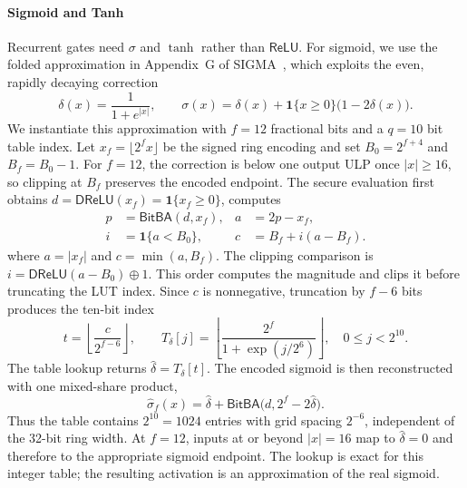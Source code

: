 \documentclass[journal]{IEEEtran}
\theoremstyle{definition}
\theoremstyle{plain}
\newcommand{\DReLU}{\mathsf{DReLU}}
\newcommand{\ReLU}{\mathsf{ReLU}}
\newcommand{\BitBA}{\mathsf{BitBA}}
\newcommand{\ind}[1]{\mathbf{1}\{#1\}}
\begin{document}
\paragraph*{Sigmoid and Tanh}
Recurrent gates need $\sigma$ and $\tanh$ rather than $\ReLU$. For sigmoid,
we use the folded approximation in Appendix~G of SIGMA~\cite{sigma}, which
exploits the even, rapidly decaying correction
\begin{equation}
  \delta(x)=\frac{1}{1+e^{|x|}}, \qquad
  \sigma(x)=\delta(x)+\ind{x\geq 0}\bigl(1-2\delta(x)\bigr).
  \label{eq:sigmoid-decomp}
\end{equation}
We instantiate this approximation with $f=12$ fractional bits and a $q=10$
bit table index. Let $x_f=\lfloor 2^f x\rfloor$ be the signed ring encoding
and set $B_0=2^{f+4}$ and $B_f=B_0-1$. For $f=12$, the correction is
below one output ULP once $|x|\geq 16$, so clipping at $B_f$ preserves the
encoded endpoint. The secure evaluation first obtains
$d=\DReLU(x_f)=\ind{x_f\geq 0}$, computes
\begin{equation}
\begin{aligned}
  p&=\BitBA(d,x_f), & a&=2p-x_f,\\
  i&=\ind{a<B_0}, & c&=B_f+i(a-B_f).
\end{aligned}
\label{eq:sigmoid-fold}
\end{equation}
where $a=|x_f|$ and $c=\min(a,B_f)$. The clipping comparison is
$i=\DReLU(a-B_0)\oplus 1$. This order computes the magnitude and clips it
before truncating the LUT index. Since $c$ is
nonnegative, truncation by $f-6$ bits produces the ten-bit index
\begin{equation}
  t=\left\lfloor\frac{c}{2^{f-6}}\right\rfloor, \qquad
  T_\delta[j]=\left\lfloor
    \frac{2^f}{1+\exp(j/2^6)}\right\rfloor,
  \quad 0\leq j<2^{10}.
  \label{eq:sigmoid-table}
\end{equation}
The table lookup returns $\widehat\delta=T_\delta[t]$. The encoded sigmoid is
then reconstructed with one mixed-share product,
\begin{equation}
  \widehat\sigma_f(x)=\widehat\delta
    +\BitBA\bigl(d,2^f-2\widehat\delta\bigr).
  \label{eq:sigmoid-stitch}
\end{equation}
Thus the table contains $2^{10}=1024$ entries with grid spacing $2^{-6}$,
independent of the 32-bit ring width. At $f=12$, inputs at or beyond
$\lvert x\rvert=16$ map to $\widehat\delta=0$ and therefore to the appropriate
sigmoid endpoint. The lookup is exact for this integer table; the resulting
activation is an approximation of the real sigmoid.
\end{document}
